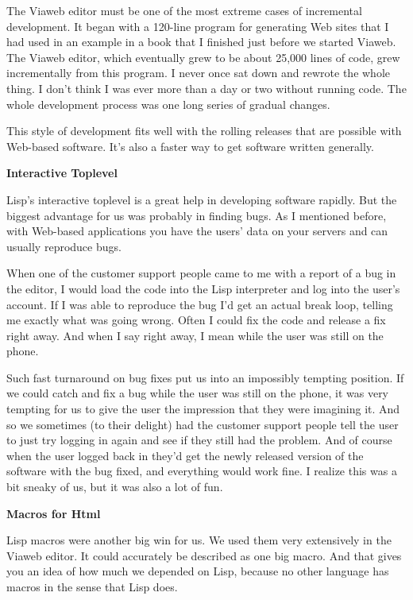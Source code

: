 The Viaweb editor must be one of the most extreme cases of incremental
development. It began with a 120-line program for generating Web sites
that I had used in an example in a book that I finished just before we
started Viaweb. The Viaweb editor, which eventually grew to be about
25,000 lines of code, grew incrementally from this program. I never once
sat down and rewrote the whole thing. I don't think I was ever more than
a day or two without running code. The whole development process was one
long series of gradual changes.

This style of development fits well with the rolling releases that are
possible with Web-based software. It's also a faster way to get software
written generally.

\textbf{Interactive Toplevel}

Lisp's interactive toplevel is a great help in developing software
rapidly. But the biggest advantage for us was probably in finding bugs.
As I mentioned before, with Web-based applications you have the users'
data on your servers and can usually reproduce bugs.

When one of the customer support people came to me with a report of a
bug in the editor, I would load the code into the Lisp interpreter and
log into the user's account. If I was able to reproduce the bug I'd get
an actual break loop, telling me exactly what was going wrong. Often I
could fix the code and release a fix right away. And when I say right
away, I mean while the user was still on the phone.

Such fast turnaround on bug fixes put us into an impossibly tempting
position. If we could catch and fix a bug while the user was still on
the phone, it was very tempting for us to give the user the impression
that they were imagining it. And so we sometimes (to their delight) had
the customer support people tell the user to just try logging in again
and see if they still had the problem. And of course when the user
logged back in they'd get the newly released version of the software
with the bug fixed, and everything would work fine. I realize this was a
bit sneaky of us, but it was also a lot of fun.

\textbf{Macros for Html}

Lisp macros were another big win for us. We used them very extensively
in the Viaweb editor. It could accurately be described as one big macro.
And that gives you an idea of how much we depended on Lisp, because no
other language has macros in the sense that Lisp does.

